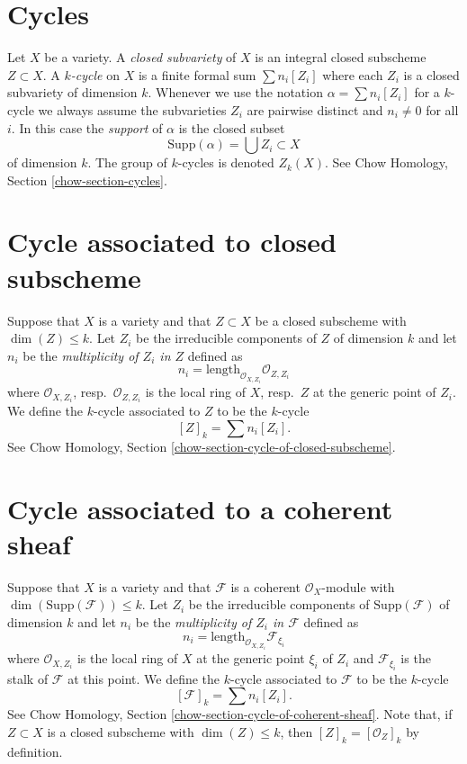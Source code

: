 \section{Cycles}
\label{intersection-section-cycles}
Let $X$ be a variety. A {\it closed subvariety} of $X$ is an integral
closed subscheme $Z \subset X$. A {\it $k$-cycle} on $X$ is a finite
formal sum $\sum n_i [Z_i]$ where each $Z_i$ is a closed subvariety
of dimension $k$. Whenever we use the notation $\alpha = \sum n_i[Z_i]$
for a $k$-cycle we always assume the subvarieties $Z_i$ are pairwise
distinct and $n_i \not = 0$ for all $i$. In this case the
{\it support} of $\alpha$ is the closed subset
$$
\text{Supp}(\alpha) = \bigcup Z_i \subset X
$$
of dimension $k$. The group of $k$-cycles is denoted $Z_k(X)$.
See Chow Homology, Section \ref{chow-section-cycles}.

\section{Cycle associated to closed subscheme}
\label{intersection-section-cycle-of-closed}
Suppose that $X$ is a variety and that $Z \subset X$ be a closed subscheme
with $\dim(Z) \leq k$. Let $Z_i$ be the irreducible components of $Z$ of
dimension $k$ and let $n_i$ be the {\it multiplicity of $Z_i$ in $Z$}
defined as
$$
n_i = \text{length}_{\mathcal{O}_{X, Z_i}} \mathcal{O}_{Z, Z_i}
$$
where $\mathcal{O}_{X, Z_i}$, resp.\ $\mathcal{O}_{Z, Z_i}$ is the
local ring of $X$, resp.\ $Z$ at the generic point of $Z_i$.
We define the $k$-cycle associated to $Z$ to be the $k$-cycle
$$
[Z]_k = \sum n_i [Z_i].
$$
See Chow Homology, Section \ref{chow-section-cycle-of-closed-subscheme}.

\section{Cycle associated to a coherent sheaf}
\label{intersection-section-cycle-of-coherent-sheaf}
Suppose that $X$ is a variety and that
$\mathcal{F}$ is a coherent $\mathcal{O}_X$-module with
$\dim(\text{Supp}(\mathcal{F})) \leq k$.
Let $Z_i$ be the irreducible components of $\text{Supp}(\mathcal{F})$
of dimension $k$ and let $n_i$ be the
{\it multiplicity of $Z_i$ in $\mathcal{F}$} defined as
$$
n_i = \text{length}_{\mathcal{O}_{X, Z_i}} \mathcal{F}_{\xi_i}
$$
where $\mathcal{O}_{X, Z_i}$ is the
local ring of $X$ at the generic point $\xi_i$ of $Z_i$
and $\mathcal{F}_{\xi_i}$ is the stalk of $\mathcal{F}$ at this point.
We define the $k$-cycle associated to $\mathcal{F}$ to be the $k$-cycle
$$
[\mathcal{F}]_k = \sum n_i [Z_i].
$$
See Chow Homology, Section \ref{chow-section-cycle-of-coherent-sheaf}.
Note that, if $Z \subset X$ is a closed subscheme with $\dim(Z) \leq k$, then
$[Z]_k = [\mathcal{O}_Z]_k$ by definition.

